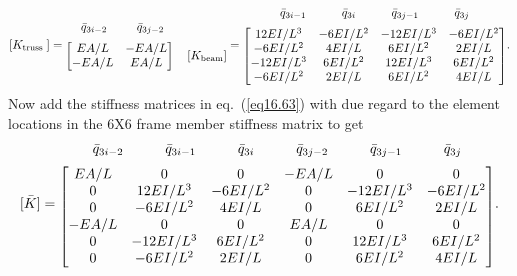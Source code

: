 \documentclass{AeroStructure-ERJohnson}
\begin{document}
\begin{align}\label{eq16.63}
\left[K_{\text {truss }}\right]=
\begin{array}{@{}c@{}}
{\arraycolsep=12pt\begin{array}{@{}c@{}}
\bar{q}_{3 i-2}\phantom{00000} \bar{q}_{3 j-2}\phantom{00000000}\end{array}}\\[6pt]
\left[\begin{array}{@{}cc@{}}
E A / L & -E A / L \\
-E A / L & E A / L\end{array}\right] \quad
\left[K_{{\rm beam }}\right]\end{array}=
\begin{array}{@{}c@{}}
{\arraycolsep=15pt\begin{array}{@{}cccc@{}}
\bar{q}_{3i-1} & \bar{q}_{3i} & \bar{q}_{3j-1}& \bar{q}_{3j}
\end{array}}\\[6pt]
\left[\begin{array}{@{}cccc@{}}12 E I / L^{3} & -6 E I / L^{2} & -12 E I / L^{3} & -6 E I / L^{2} \\-6 E I / L^{2} & 4 E I / L & 6 E I / L^{2} & 2 E I / L \\-12 E I / L^{3} & 6 E I / L^{2} & 12 E I / L^{3} & 6 E I / L^{2} \\-6 E I / L^{2} & 2 E I / L & 6 E I / L^{2} & 4 E I / L\end{array}\right]\end{array}.
\end{align}
Now add the stiffness matrices in eq.~(\ref{eq16.63}) with due regard to the element locations in the 6X6 frame member stiffness matrix to get
\begin{align}\label{eq16.64}
[\bar{K}]=
\begin{array}{@{}c@{}}
{\arraycolsep=15pt\begin{array}{@{}cccccc@{}}
\bar{q}_{3i-2} &\bar{q}_{3i-1} &\bar{q}_{3i} &\bar{q}_{3j-2}& \bar{q}_{3j-1}& \bar{q}_{3j}
\end{array}}\\[6pt]
\left[\begin{array}{@{}cccccc@{}}E A / L & 0 & 0 & -E A / L & 0 & 0 \\0 & 12 E I / L^{3} & -6 E I / L^{2} & 0 & -12 E I / L^{3} & -6 E I / L^{2} \\0 & -6 E I / L^{2} & 4 E I / L & 0 & 6 E I / L^{2} & 2 E I / L \\-E A / L & 0 & 0 & E A / L & 0 & 0 \\0 & -12 E I / L^{3} & 6 E I / L^{2} & 0 & 12 E I / L^{3} & 6 E I / L^{2} \\0 & -6 E I / L^{2} & 2 E I / L & 0 & 6 E I / L^{2} & 4 E I / L\end{array}\right]\end{array}.
\end{align}
\end{document}
